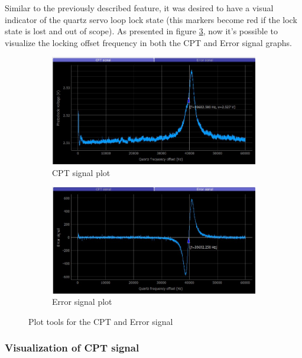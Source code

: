 \documentclass[a4paper,12pt]{article}
\begin{document}
Similar to the previously described feature, it was desired to have a visual indicator of the quartz servo loop lock state (this markers become red if the lock state is lost and out of scope). As presented in figure \ref{fig:plot_tools_2}, now it's possible to visualize the locking offset frequency in both the CPT and Error signal graphs.
\begin{figure}[!h]
\centering
\begin{subfigure}[b]{0.49\textwidth}
\centering
\includegraphics[height=0.52\textwidth]{Images/plot_tools_2.png}
\captionsetup{justification=centering}
\caption{CPT signal plot}
\label{fig:cpt_signal}
\end{subfigure}
\hfill
\begin{subfigure}[b]{0.49\textwidth}
\centering
\includegraphics[height=0.52\textwidth]{Images/plot_tools_3.png}
\captionsetup{justification=centering}
\caption{Error signal plot}
\label{fig:error_signal}
\end{subfigure}
\caption{Plot tools for the CPT and Error signal} 
\label{fig:plot_tools_2}
\end{figure}
    
\subsubsection{Visualization of CPT signal}
\label{section:CPT}
\end{document}
